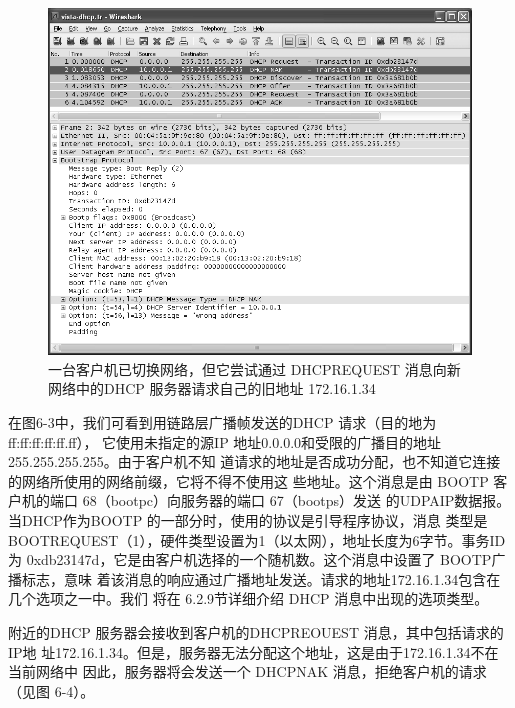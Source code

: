 \begin{figure}[H]
    \centering
	\includegraphics[scale=0.5]{imgs/6/6-4.png}
	\caption{一台客户机已切换网络，但它尝试通过 DHCPREQUEST 消息向新网络中的DHCP 服务器请求自己的旧地址 172.16.1.34}
\end{figure}

在图6-3中，我们可看到用链路层广播帧发送的DHCP 请求（目的地为ff:ff:ff:ff:ff.ff），
它使用未指定的源IP 地址0.0.0.0和受限的广播目的地址 255.255.255.255。由于客户机不知
道请求的地址是否成功分配，也不知道它连接的网络所使用的网络前缀，它将不得不使用这
些地址。这个消息是由 BOOTP 客户机的端口 68（bootpc）向服务器的端口 67（bootps）发送
的UDPAIP数据报。当DHCP作为BOOTP 的一部分时，使用的协议是引导程序协议，消息
类型是 BOOTREQUEST（1），硬件类型设置为1（以太网），地址长度为6字节。事务ID 为
0xdb23147d，它是由客户机选择的一个随机数。这个消息中设置了 BOOTP广播标志，意味
着该消息的响应通过广播地址发送。请求的地址172.16.1.34包含在几个选项之一中。我们
将在 6.2.9节详细介绍 DHCP 消息中出现的选项类型。

附近的DHCP 服务器会接收到客户机的DHCPREOUEST 消息，其中包括请求的IP地
址172.16.1.34。但是，服务器无法分配这个地址，这是由于172.16.1.34不在当前网络中
因此，服务器将会发送一个 DHCPNAK 消息，拒绝客户机的请求（见图 6-4）。


